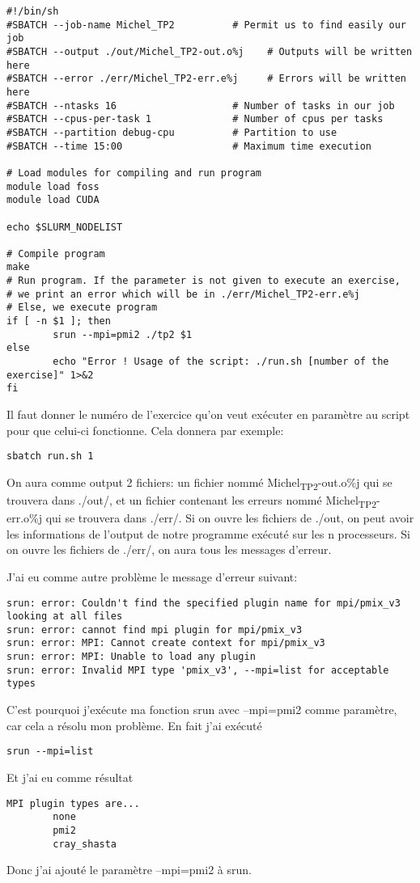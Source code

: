 \documentclass[11pt]{article}
\begin{document}
\begin{verbatim}
#!/bin/sh
#SBATCH --job-name Michel_TP2          # Permit us to find easily our job
#SBATCH --output ./out/Michel_TP2-out.o%j    # Outputs will be written here
#SBATCH --error ./err/Michel_TP2-err.e%j     # Errors will be written here
#SBATCH --ntasks 16                    # Number of tasks in our job
#SBATCH --cpus-per-task 1              # Number of cpus per tasks
#SBATCH --partition debug-cpu          # Partition to use
#SBATCH --time 15:00                   # Maximum time execution

# Load modules for compiling and run program
module load foss
module load CUDA

echo $SLURM_NODELIST

# Compile program
make
# Run program. If the parameter is not given to execute an exercise,
# we print an error which will be in ./err/Michel_TP2-err.e%j
# Else, we execute program
if [ -n $1 ]; then
        srun --mpi=pmi2 ./tp2 $1
else
        echo "Error ! Usage of the script: ./run.sh [number of the exercise]" 1>&2
fi

\end{verbatim}

Il faut donner le numéro de l'exercice qu'on veut exécuter en paramètre au script pour que
celui-ci fonctionne. Cela donnera par exemple:
\begin{verbatim}
sbatch run.sh 1
\end{verbatim}
On aura comme output 2 fichiers: un fichier nommé Michel\textsubscript{TP2}-out.o\%j qui se trouvera dans ./out/, et un fichier contenant
les erreurs nommé Michel\textsubscript{TP2}-err.o\%j qui se trouvera dans ./err/. Si on ouvre les fichiers de ./out, on peut avoir les informations
de l'output de notre programme exécuté sur les n processeurs.
Si on ouvre les fichiers de ./err/, on aura tous les messages d'erreur.

J'ai eu comme autre problème le message d'erreur suivant:
\begin{verbatim}
srun: error: Couldn't find the specified plugin name for mpi/pmix_v3 looking at all files
srun: error: cannot find mpi plugin for mpi/pmix_v3
srun: error: MPI: Cannot create context for mpi/pmix_v3
srun: error: MPI: Unable to load any plugin
srun: error: Invalid MPI type 'pmix_v3', --mpi=list for acceptable types
\end{verbatim}
C'est pourquoi j'exécute ma fonction srun avec --mpi=pmi2 comme paramètre, car cela a résolu mon problème.
En fait j'ai exécuté
\begin{verbatim}
srun --mpi=list
\end{verbatim}
Et j'ai eu comme résultat
\begin{verbatim}
MPI plugin types are...
        none
        pmi2
        cray_shasta
\end{verbatim}
Donc j'ai ajouté le paramètre --mpi=pmi2 à srun.
\end{document}
